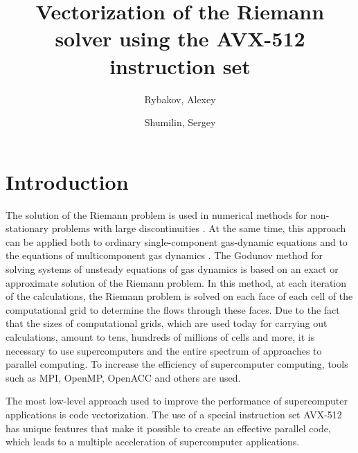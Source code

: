 \documentclass[utf8,english]{psta}%
\title[vectorization of the Riemann solver]{Vectorization of the Riemann solver using the AVX-512 instruction set}
\author{Rybakov, Alexey}
\author{Shumilin, Sergey}
\begin{document}
          
\maketitle 
\section*{Introduction}
The solution of the Riemann problem is used in numerical methods for non-stationary problems with large discontinuities \cite{KulPogSemRiemann}.
At the same time, this approach can be applied both to ordinary single-component gas-dynamic equations and to the equations of multicomponent gas dynamics \cite{BorRykRiemann}.
The Godunov method for solving systems of unsteady equations of gas dynamics \cite{Godunov} is based on an exact or approximate solution of the Riemann problem.
In this method, at each iteration of the calculations, the Riemann problem is solved on each face of each cell of the computational grid to determine the flows through these faces.
Due to the fact that the sizes of computational grids, which are used today for carrying out calculations, amount to tens, hundreds of millions of cells and more, it is necessary to use supercomputers and the entire spectrum of approaches to parallel computing.
To increase the efficiency of supercomputer computing, tools such as MPI, OpenMP, OpenACC and others are used.

The most low-level approach used to improve the performance of supercomputer applications is code vectorization.
The use of a special instruction set AVX-512 has unique features that make it possible to create an effective parallel code, which leads to a multiple acceleration of supercomputer applications.
\end{document}
